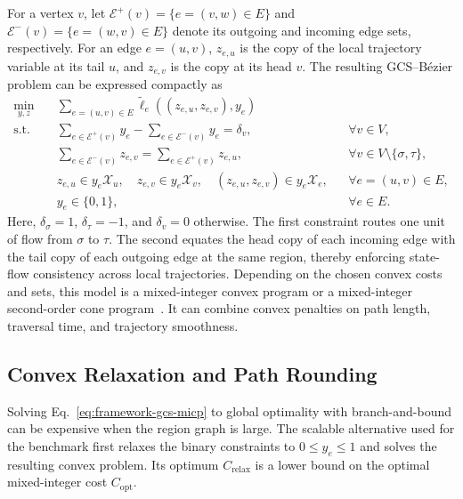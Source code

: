 For a vertex $v$, let
$\mathcal{E}^{+}(v)=\{e=(v,w)\in E\}$ and
$\mathcal{E}^{-}(v)=\{e=(w,v)\in E\}$ denote its outgoing and incoming edge
sets, respectively.  For an edge $e=(u,v)$, $z_{e,u}$ is the copy of the local
trajectory variable at its tail $u$, and $z_{e,v}$ is the copy at its head $v$.
The resulting GCS--B\'ezier problem can be expressed compactly as
\begin{equation}
\begin{aligned}
  \min_{y,z}\quad &
    \sum_{e=(u,v)\in E}
    \widetilde{\ell}_e((z_{e,u},z_{e,v}),y_e) \\
  \text{s.t.}\quad &
    \sum_{e\in\mathcal{E}^{+}(v)}y_e-
    \sum_{e\in\mathcal{E}^{-}(v)}y_e=\delta_v,
    && \forall v\in V,\\
  &
    \sum_{e\in\mathcal{E}^{-}(v)}z_{e,v}=
    \sum_{e\in\mathcal{E}^{+}(v)}z_{e,u},
    && \forall v\in V\setminus\{\sigma,\tau\},\\
  &
    z_{e,u}\in y_e\mathcal{X}_u,\quad
    z_{e,v}\in y_e\mathcal{X}_v,\quad
    (z_{e,u},z_{e,v})\in y_e\mathcal{X}_e,
    && \forall e=(u,v)\in E,\\
  & y_e\in\{0,1\},
    && \forall e\in E .
\end{aligned}
\label{eq:framework-gcs-micp}
\end{equation}
Here, $\delta_\sigma=1$, $\delta_\tau=-1$, and $\delta_v=0$ otherwise.
The first constraint routes one unit of flow from $\sigma$ to $\tau$.  The second equates the
head copy of each incoming edge with the tail copy of each outgoing edge at the
same region, thereby enforcing state-flow consistency across local
trajectories.  Depending on the chosen convex costs and
sets, this model is a mixed-integer convex program or a mixed-integer
second-order cone program~\cite{MarcucciEtAl2023GCS,MarcucciEtAl2023MotionPlanning}.
It can combine convex penalties on path length, traversal time, and trajectory
smoothness.

\subsection{Convex Relaxation and Path Rounding}
\label{sec:gcs-relaxation-rounding}

Solving Eq.~\eqref{eq:framework-gcs-micp} to global optimality with
branch-and-bound can be expensive when the region graph is large. The scalable
alternative used for the benchmark first relaxes the binary constraints to
$0\leq y_e\leq1$ and solves the resulting convex problem. Its optimum
$C_{\mathrm{relax}}$ is a lower bound on the optimal mixed-integer cost
$C_{\mathrm{opt}}$.

